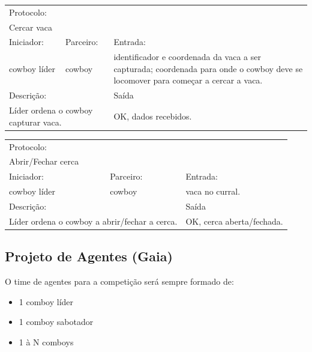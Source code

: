 \documentclass{llncs}
\begin{document}
\begin{center}
\begin{tabular}{|p{2.5cm}|p{2.5cm}|p{5cm}}
\cline{1-2}
\multicolumn{2}{|l|}{Protocolo:} \\
\multicolumn{2}{|l|}{Cercar vaca}  \\
\hline
Iniciador: 			&Parceiro:		&Entrada: \\
cowboy líder 			&cowboy		&identificador e coordenada da vaca a ser capturada; coordenada para onde o cowboy deve se locomover para começar a cercar a vaca. \\
\hline
\multicolumn{2}{|p{5cm}|}{Descrição:}  &Saída \\
\multicolumn{2}{|p{5cm}|}{Líder ordena o cowboy capturar vaca.}  &OK, dados recebidos. \\
\hline
\end{tabular}
\end{center}

\begin{center}
\begin{tabular}{|p{2.5cm}|p{2.5cm}|p{5cm}}
\cline{1-2}
\multicolumn{2}{|l|}{Protocolo:} \\
\multicolumn{2}{|l|}{Abrir/Fechar cerca}  \\
\hline
Iniciador: 			&Parceiro:		&Entrada: \\
cowboy líder 			&cowboy		&vaca no curral.\\
\hline
\multicolumn{2}{|p{5cm}|}{Descrição:}  &Saída \\
\multicolumn{2}{|p{5cm}|}{Líder ordena o cowboy a abrir/fechar a cerca.}  &OK, cerca aberta/fechada. \\
\hline
\end{tabular}
\end{center}


\subsection{Projeto de Agentes (Gaia)}

O time de agentes para a competição será sempre formado de:

\begin{itemize}
\item 1 comboy líder
\item 1 comboy sabotador
\item 1 à N comboys
\end{itemize}
\end{document}

